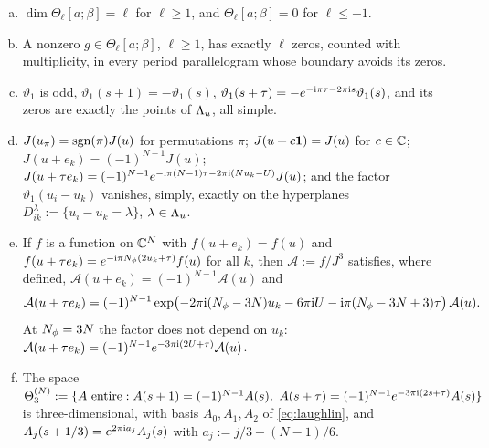 \begin{lemma}\label{lem:theta}
\begin{enumerate}[(a)]
\item $\dim\Theta_\ell[a;\beta]=\ell$ for $\ell\ge1$, and $\Theta_\ell[a;\beta]=0$ for $\ell\le-1$.
\item A nonzero $g\in\Theta_\ell[a;\beta]$, $\ell\ge1$, has exactly $\ell$ zeros, counted with multiplicity, in every period
parallelogram whose boundary avoids its zeros.
\item $\vartheta_1$ is odd, $\vartheta_1(s+1)=-\vartheta_1(s)$, $\vartheta_1(s+\tau)=-e^{-\mathrm{i}\pi\tau-2\pi\mathrm{i} s}\vartheta_1(s)$, and its zeros
are exactly the points of $\Lambda_u$, all simple.
\item $J(u_\pi)=\operatorname{sgn}(\pi)J(u)$ for permutations $\pi$; $J(u+c\mathbf{1})=J(u)$ for $c\in\mathbb{C}$; $J(u+e_k)=(-1)^{N-1}J(u)$;
$J(u+\tau e_k)=(-1)^{N-1}e^{-\mathrm{i}\pi(N-1)\tau-2\pi\mathrm{i}(Nu_k-U)}J(u)$; and the factor $\vartheta_1(u_i-u_k)$ vanishes, simply, exactly
on the hyperplanes $D_{ik}^\lambda:=\{u_i-u_k=\lambda\}$, $\lambda\in\Lambda_u$.
\item If $f$ is a function on $\mathbb{C}^N$ with $f(u+e_k)=f(u)$ and $f(u+\tau e_k)=e^{-\mathrm{i}\pi N_{\phi}(2u_k+\tau)}f(u)$ for all $k$, then
$\mathcal A:=f/J^3$ satisfies, where defined, $\mathcal A(u+e_k)=(-1)^{N-1}\mathcal A(u)$ and
\[
\mathcal A(u+\tau e_k)=(-1)^{N-1}\exp\bigl(-2\pi\mathrm{i}(N_{\phi}-3N)u_k-6\pi\mathrm{i} U-\mathrm{i}\pi(N_{\phi}-3N+3)\tau\bigr)\,\mathcal A(u).
\]
At $N_{\phi}=3N$ the factor does not depend on $u_k$: $\mathcal A(u+\tau e_k)=(-1)^{N-1}e^{-3\pi\mathrm{i}(2U+\tau)}\mathcal A(u)$.
\item The space $\Theta^{(N)}_3:=\{A\ \text{entire}:A(s+1)=(-1)^{N-1}A(s),\ A(s+\tau)=(-1)^{N-1}e^{-3\pi\iu(2s+\tau)}A(s)\}$ is
three-dimensional, with basis $A_0,A_1,A_2$ of \eqref{eq:laughlin}, and $A_j(s+1/3)=e^{2\pi\mathrm{i} a_j}A_j(s)$ with
$a_j:=j/3+(N-1)/6$.
\end{enumerate}
\end{lemma}

